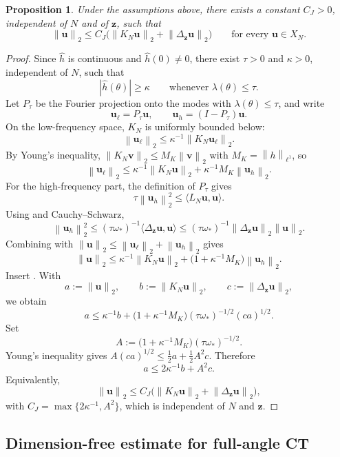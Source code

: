 \documentclass{article}
\newtheorem{proposition}[theorem]{Proposition}
\theoremstyle{remark}
\newcommand{\norm}[1]{\left\lVert #1 \right\rVert}
\newcommand{\bz}{{\bm{z}}}
\newcommand{\bu}{{\bm{u}}}
\newcommand{\bv}{{\bm{v}}}
\begin{document}
\begin{proposition}\label{prop:dim-free-deblurring}
Under the assumptions above, there exists a constant $C_J>0$, independent of $N$ and of $\bz$, such that
\[
\norm{\bu}_2\le C_J\bigl(\norm{K_N\bu}_2+\norm{\Delta_\bz\bu}_2\bigr)
\qquad\text{for every }\bu\in X_N.
\]
\end{proposition}

\begin{proof}
Since $\widehat h$ is continuous and $\widehat h(0)\ne0$, there exist $\tau>0$ and $\kappa>0$, independent of $N$, such that
\[
|\widehat h(\theta)|\ge \kappa
\qquad\text{whenever }\lambda(\theta)\le\tau.
\]
Let $P_\tau$ be the Fourier projection onto the modes with $\lambda(\theta)\le\tau$, and write
\[
\bu_\ell=P_\tau\bu,
\qquad
\bu_h=(I-P_\tau)\bu.
\]
On the low-frequency space, $K_N$ is uniformly bounded below:
\[
\norm{\bu_\ell}_2\le \kappa^{-1}\norm{K_N\bu_\ell}_2.
\]
By Young's inequality, $\norm{K_N\bv}_2\le M_K\norm{\bv}_2$ with $M_K=\norm{h}_{\ell^1}$, so
\begin{equation}\label{eq:low-bound-blur}
\norm{\bu_\ell}_2
\le \kappa^{-1}\norm{K_N\bu}_2+\kappa^{-1}M_K\norm{\bu_h}_2.
\end{equation}
For the high-frequency part, the definition of $P_\tau$ gives
\[
\tau\norm{\bu_h}_2^2\le \langle L_N\bu,\bu\rangle.
\]
Using  and Cauchy--Schwarz,
\begin{equation}\label{eq:high-bound-blur}
\norm{\bu_h}_2^2
\le (\tau\omega_*)^{-1}\langle\Delta_\bz\bu,\bu\rangle
\le (\tau\omega_*)^{-1}\norm{\Delta_\bz\bu}_2\norm{\bu}_2.
\end{equation}
Combining  with $\norm{\bu}_2\le\norm{\bu_\ell}_2+\norm{\bu_h}_2$ gives
\[
\norm{\bu}_2
\le \kappa^{-1}\norm{K_N\bu}_2
+\bigl(1+\kappa^{-1}M_K\bigr)\norm{\bu_h}_2.
\]
Insert . With
\[
a:=\norm{\bu}_2,
\qquad b:=\norm{K_N\bu}_2,
\qquad c:=\norm{\Delta_\bz\bu}_2,
\]
we obtain
\[
a\le \kappa^{-1}b+
\bigl(1+\kappa^{-1}M_K\bigr)(\tau\omega_*)^{-1/2}(ca)^{1/2}.
\]
Set
\[
A:=\bigl(1+\kappa^{-1}M_K\bigr)(\tau\omega_*)^{-1/2}.
\]
Young's inequality gives $A(ca)^{1/2}\le \frac12 a+\frac12 A^2c$. Therefore
\[
a\le 2\kappa^{-1}b+A^2c.
\]
Equivalently,
\[
\norm{\bu}_2\le C_J\bigl(\norm{K_N\bu}_2+\norm{\Delta_\bz\bu}_2\bigr),
\]
with $C_J=\max\{2\kappa^{-1},A^2\}$, which is independent of $N$ and $\bz$.
\end{proof}


\subsection{Dimension-free estimate for full-angle CT}\label{sec:appendix-CT}
\end{document}
